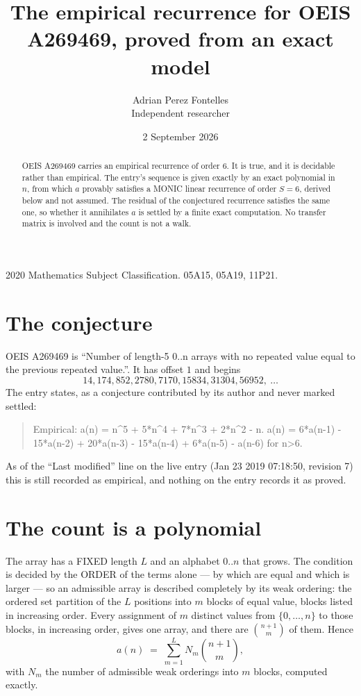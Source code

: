 \documentclass[11pt,a4paper]{article}
\title{The empirical recurrence for OEIS A269469, proved from an exact model}
\author{Adrian Perez Fontelles\\ \small Independent researcher}
\date{2 September 2026}
\theoremstyle{plain}
\theoremstyle{definition}
\begin{document}
\maketitle

\begin{abstract}
OEIS A269469 carries an empirical recurrence of order $6$. It is true, and it is
decidable rather than empirical. The entry's sequence is given exactly by an exact polynomial in $n$, from
which $a$ provably satisfies a MONIC linear recurrence of order $S=6$, derived below and not
assumed. The residual of the conjectured recurrence satisfies the same one, so whether it
annihilates $a$ is settled by a finite exact computation. No transfer matrix is involved and
the count is not a walk.
\end{abstract}

\noindent\small 2020 Mathematics Subject Classification. 05A15, 05A19, 11P21.\normalsize

\section{The conjecture}

OEIS A269469 is ``Number of length-5 0..n arrays with no repeated value equal to the previous repeated value.''. It has offset $1$ and begins
\[
14, 174, 852, 2780, 7170, 15834, 31304, 56952,\ \dots
\]
The entry states, as a conjecture contributed by its author and never marked settled:
\begin{quote}
Empirical: a(n) = n\^{}5 + 5*n\^{}4 + 7*n\^{}3 + 2*n\^{}2 - n. a(n) = 6*a(n-1) - 15*a(n-2) + 20*a(n-3) - 15*a(n-4) + 6*a(n-5) - a(n-6) for n>6.
\end{quote}
As of the ``Last modified'' line on the live entry (Jan 23 2019 07:18:50, revision 7)
this is still recorded as empirical, and nothing on the entry records it as proved.

\section{The count is a polynomial}

The array has a FIXED length $L$ and an alphabet $0..n$ that grows. The condition is decided by
the ORDER of the terms alone --- by which are equal and which is larger --- so an admissible
array is described completely by its weak ordering: the ordered set partition of the $L$
positions into $m$ blocks of equal value, blocks listed in increasing order. Every assignment
of $m$ distinct values from $\{0,\dots,n\}$ to those blocks, in increasing order, gives one
array, and there are $\binom{n+1}{m}$ of them. Hence
\[
a(n)\;=\;\sum_{m=1}^{L} N_m\binom{n+1}{m},
\]
with $N_m$ the number of admissible weak orderings into $m$ blocks, computed exactly.
\end{document}
